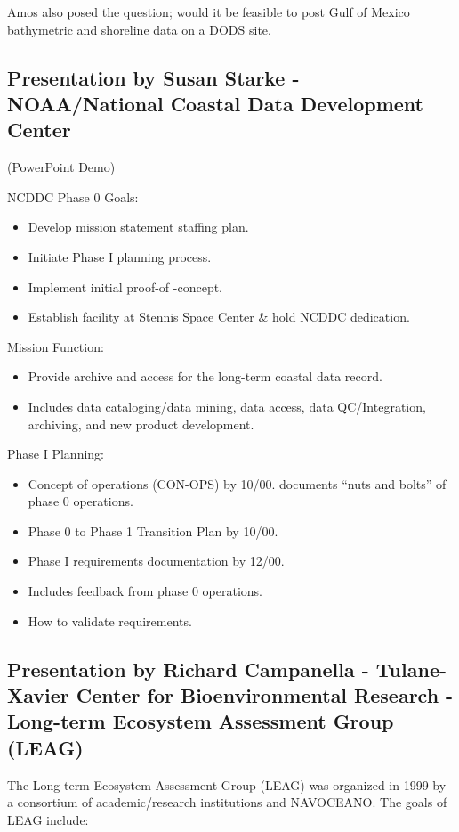 Amos also posed the question; would it be feasible to post Gulf of Mexico bathymetric and 
shoreline data on a DODS site.

\subsection{Presentation by Susan Starke - NOAA/National Coastal Data Development Center}

(PowerPoint Demo)

NCDDC Phase 0 Goals:
\begin{itemize}
\item Develop mission statement staffing plan.
\item Initiate Phase I planning process.
\item Implement initial proof-of -concept.
\item Establish facility at Stennis Space Center \& hold NCDDC dedication.
\end{itemize}

Mission Function:
\begin{itemize}
\item Provide archive and access for the long-term coastal data record.
\item Includes data cataloging/data mining, data access, data QC/Integration, archiving, and new 
product development.
\end{itemize}

Phase I Planning:
\begin{itemize}
\item Concept of operations (CON-OPS) by 10/00.
documents ``nuts and bolts'' of phase 0 operations.
\item Phase 0 to Phase 1 Transition Plan by 10/00.
\item Phase I requirements documentation by 12/00.
\item Includes feedback from phase 0 operations.
\item How to validate requirements.
\end{itemize}

\subsection{Presentation by Richard Campanella - Tulane-Xavier Center for Bioenvironmental 
Research - Long-term Ecosystem Assessment Group (LEAG)}


The Long-term Ecosystem Assessment Group (LEAG) was organized in 1999 by a consortium 
of academic/research institutions and NAVOCEANO. The goals of LEAG include:

